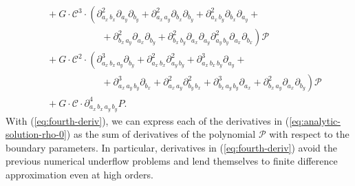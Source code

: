\documentclass[10pt]{article}
\begin{document}
\begin{align}
                                                                                             &\,\, + G \cdot \mathcal{C}^3 \cdot \left( \partial^2_{a_x\, b_x} \partial_{a_y} \partial_{b_y} + \partial^2_{a_x\, a_y} \partial_{b_x} \partial_{b_y} + \partial^2_{a_x\, b_y} \partial_{b_x} \partial_{a_y} + \right. \nonumber \\
                                                                                             & \left. \qquad\qquad\qquad +\partial^2_{b_x\, a_y} \partial_{a_x} \partial_{b_y} + \partial^2_{b_x\, b_y} \partial_{a_x} \partial_{a_y} \partial^2_{a_y\, b_y} \partial_{a_x} \partial_{b_x} \right) \mathcal{P} \nonumber \\
                                                                                             &\,\, + G \cdot \mathcal{C}^2 \cdot \left( \partial^3_{a_x\,b_x\,a_y} \partial_{b_y} + \partial^2_{a_x\,b_x}\partial^2_{a_y\,b_y} + \partial^3_{a_x\,b_x\,b_y}\partial_{a_y}  + \right. \nonumber \\
                                                                                             & \left. \qquad\qquad\qquad + \partial^3_{a_x\,a_y\,b_y} \partial_{b_x} + \partial^2_{a_x\,a_y} \partial^2_{b_y\,b_x} + \partial^3_{b_x\,a_y\,b_y}\partial_{a_x} + \partial^2_{b_x\,a_y}\partial_{a_x}\partial_{b_y} \right) \mathcal{P} \nonumber \\
                                                                                             &\,\, + G \cdot \mathcal{C} \cdot \partial^4_{a_x\,b_x\,a_y\,b_y} P. \label{eq:fourth-deriv}
\end{align}
With (\ref{eq:fourth-deriv}), we can express each of the derivatives
in (\ref{eq:analytic-solution-rho-0}) as the sum of derivatives of the
polynomial $\mathcal{P}$ with respect to the boundary parameters. In
particular, derivatives in (\ref{eq:fourth-deriv}) avoid the previous
numerical underflow problems and lend themselves to finite difference
approximation even at high orders.
\end{document}
